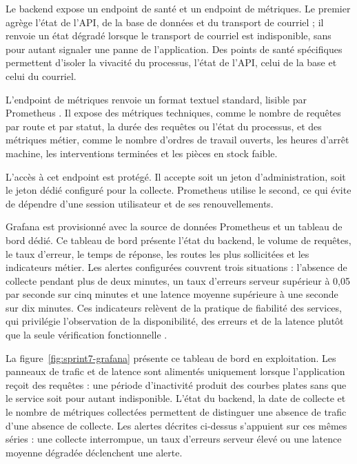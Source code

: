 Le backend expose un endpoint de santé et un endpoint de métriques. Le premier agrège l'état de l'API, de la base de données et du transport de courriel ; il renvoie un état dégradé lorsque le transport de courriel est indisponible, sans pour autant signaler une panne de l'application. Des points de santé spécifiques permettent d'isoler la vivacité du processus, l'état de l'API, celui de la base et celui du courriel.

L'endpoint de métriques renvoie un format textuel standard, lisible par Prometheus \cite{prometheus_docs}. Il expose des métriques techniques, comme le nombre de requêtes par route et par statut, la durée des requêtes ou l'état du processus, et des métriques métier, comme le nombre d'ordres de travail ouverts, les heures d'arrêt machine, les interventions terminées et les pièces en stock faible.

L'accès à cet endpoint est protégé. Il accepte soit un jeton d'administration, soit le jeton dédié configuré pour la collecte. Prometheus utilise le second, ce qui évite de dépendre d'une session utilisateur et de ses renouvellements.

Grafana \cite{grafana_docs} est provisionné avec la source de données Prometheus et un tableau de bord dédié. Ce tableau de bord présente l'état du backend, le volume de requêtes, le taux d'erreur, le temps de réponse, les routes les plus sollicitées et les indicateurs métier. Les alertes configurées couvrent trois situations : l'absence de collecte pendant plus de deux minutes, un taux d'erreurs serveur supérieur à 0,05 par seconde sur cinq minutes et une latence moyenne supérieure à une seconde sur dix minutes. Ces indicateurs relèvent de la pratique de fiabilité des services, qui privilégie l'observation de la disponibilité, des erreurs et de la latence plutôt que la seule vérification fonctionnelle \cite{sre_book}.

La figure~\ref{fig:sprint7-grafana} présente ce tableau de bord en exploitation. Les panneaux de trafic et de latence sont alimentés uniquement lorsque l'application reçoit des requêtes : une période d'inactivité produit des courbes plates sans que le service soit pour autant indisponible. L'état du backend, la date de collecte et le nombre de métriques collectées permettent de distinguer une absence de trafic d'une absence de collecte. Les alertes décrites ci-dessus s'appuient sur ces mêmes séries : une collecte interrompue, un taux d'erreurs serveur élevé ou une latence moyenne dégradée déclenchent une alerte.

